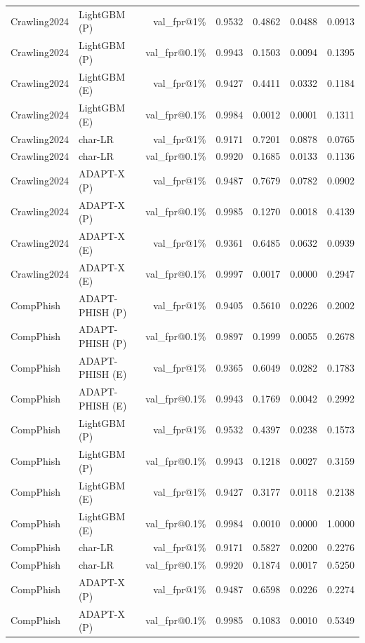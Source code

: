 \begin{table}[t]
\begin{tabular}{llrrrrr}
Crawling2024 & LightGBM (P) & val\_fpr@1\% & 0.9532 & 0.4862 & 0.0488 & 0.0913 \\
Crawling2024 & LightGBM (P) & val\_fpr@0.1\% & 0.9943 & 0.1503 & 0.0094 & 0.1395 \\
Crawling2024 & LightGBM (E) & val\_fpr@1\% & 0.9427 & 0.4411 & 0.0332 & 0.1184 \\
Crawling2024 & LightGBM (E) & val\_fpr@0.1\% & 0.9984 & 0.0012 & 0.0001 & 0.1311 \\
Crawling2024 & char-LR & val\_fpr@1\% & 0.9171 & 0.7201 & 0.0878 & 0.0765 \\
Crawling2024 & char-LR & val\_fpr@0.1\% & 0.9920 & 0.1685 & 0.0133 & 0.1136 \\
Crawling2024 & ADAPT-X (P) & val\_fpr@1\% & 0.9487 & 0.7679 & 0.0782 & 0.0902 \\
Crawling2024 & ADAPT-X (P) & val\_fpr@0.1\% & 0.9985 & 0.1270 & 0.0018 & 0.4139 \\
Crawling2024 & ADAPT-X (E) & val\_fpr@1\% & 0.9361 & 0.6485 & 0.0632 & 0.0939 \\
Crawling2024 & ADAPT-X (E) & val\_fpr@0.1\% & 0.9997 & 0.0017 & 0.0000 & 0.2947 \\
CompPhish & ADAPT-PHISH (P) & val\_fpr@1\% & 0.9405 & 0.5610 & 0.0226 & 0.2002 \\
CompPhish & ADAPT-PHISH (P) & val\_fpr@0.1\% & 0.9897 & 0.1999 & 0.0055 & 0.2678 \\
CompPhish & ADAPT-PHISH (E) & val\_fpr@1\% & 0.9365 & 0.6049 & 0.0282 & 0.1783 \\
CompPhish & ADAPT-PHISH (E) & val\_fpr@0.1\% & 0.9943 & 0.1769 & 0.0042 & 0.2992 \\
CompPhish & LightGBM (P) & val\_fpr@1\% & 0.9532 & 0.4397 & 0.0238 & 0.1573 \\
CompPhish & LightGBM (P) & val\_fpr@0.1\% & 0.9943 & 0.1218 & 0.0027 & 0.3159 \\
CompPhish & LightGBM (E) & val\_fpr@1\% & 0.9427 & 0.3177 & 0.0118 & 0.2138 \\
CompPhish & LightGBM (E) & val\_fpr@0.1\% & 0.9984 & 0.0010 & 0.0000 & 1.0000 \\
CompPhish & char-LR & val\_fpr@1\% & 0.9171 & 0.5827 & 0.0200 & 0.2276 \\
CompPhish & char-LR & val\_fpr@0.1\% & 0.9920 & 0.1874 & 0.0017 & 0.5250 \\
CompPhish & ADAPT-X (P) & val\_fpr@1\% & 0.9487 & 0.6598 & 0.0226 & 0.2274 \\
CompPhish & ADAPT-X (P) & val\_fpr@0.1\% & 0.9985 & 0.1083 & 0.0010 & 0.5349 \\

\end{tabular}
\end{table}
